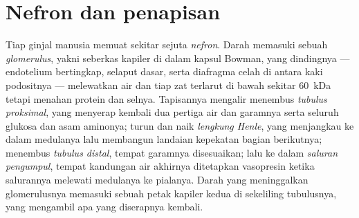 \section{Nefron dan penapisan}

\begin{definition}[Nefron]\label{def:b3:renal-osmoregulation:nephron}
%
Tiap ginjal manusia memuat sekitar sejuta \emph{nefron}. Darah memasuki
sebuah \emph{glomerulus}, yakni seberkas kapiler di dalam kapsul Bowman, yang
dindingnya --- endotelium bertingkap, selaput dasar, serta
diafragma celah di antara kaki podositnya --- melewatkan air dan tiap zat terlarut
di bawah sekitar \qty{60}{kDa} tetapi menahan protein dan selnya. Tapisannya
mengalir menembus \emph{tubulus proksimal}, yang menyerap kembali dua
pertiga air dan garamnya serta seluruh glukosa dan asam aminonya; turun
dan naik \emph{lengkung Henle}, yang menjangkau ke dalam medulanya lalu
membangun landaian kepekatan bagian berikutnya; menembus
\emph{tubulus distal}, tempat garamnya disesuaikan; lalu ke dalam
\emph{saluran pengumpul}, tempat kandungan air akhirnya ditetapkan
vasopresin ketika salurannya melewati medulanya ke pialanya. Darah
yang meninggalkan glomerulusnya memasuki sebuah petak kapiler kedua di sekeliling
tubulusnya, yang mengambil apa yang diserapnya kembali.
\end{definition}

